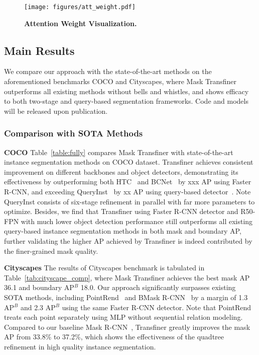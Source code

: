 \documentclass[10pt,twocolumn,letterpaper]{article}
\newcommand{\parsection}[1]{\vspace{1mm}\noindent\textbf{#1}}
\begin{document}
\begin{figure}[!t]
	\centering
\texttt{[image: figures/att\_weight.pdf]}
	\caption{\textbf{Attention Weight Visualization.}}
	\label{fig:att_vis}
	\vspace{-0.1in}
\end{figure}

\subsection{Main Results}

We compare our approach with the state-of-the-art methods on the aforementioned benchmarks COCO and Cityscapes, where Mask Transfiner outperforms all existing methods without bells and whistles, and shows efficacy to both two-stage and query-based segmentation frameworks. 
Code and models will be released upon publication.

\subsubsection{Comparison with SOTA Methods}

\parsection{COCO} Table~\ref{table:fully} compares Mask Transfiner with state-of-the-art instance segmentation methods on COCO dataset.
Transfiner achieves consistent improvement on different backbones and object detectors, demonstrating its effectiveness by outperforming both HTC~\cite{chen2019hybrid} and BCNet~\cite{ke2021bcnet} by xxx AP using Faster R-CNN, and exceeding QueryInst~\cite{QueryInst} by xx AP using query-based detector~\cite{carion2020end}. Note QueryInst consists of six-stage refinement in parallel with far more parameters to optimize.
Besides, we find that Transfiner using Faster R-CNN detector and R50-FPN with much lower object detection performance still outperforms all existing query-based instance segmentation methods in both mask and boundary AP, further validating the higher AP achieved by Transfiner is indeed contributed by the finer-grained mask quality.


\parsection{Cityscapes}
The results of Cityscapes benchmark is tabulated in Table~\ref{tab:cityscape_comp}, where Mask Transfiner achieves the best mask AP 36.1 and boundary AP$^{B}$ 18.0. Our approach significantly surpasses existing SOTA methods, including PointRend~\cite{kirillov2020pointrend}
and BMask R-CNN~\cite{ChengWHL20} by a margin of 1.3 AP$^{B}$ and 2.3 AP$^{B}$ using the same Faster R-CNN detector. Note that PointRend treats each point separately using MLP without sequential relation modeling. Compared to our baseline Mask R-CNN~\cite{he2017mask}, Transfiner greatly improves the mask AP from 33.8\% to 37.2\%, which shows the effectiveness of the quadtree refinement in high quality instance segmentation.
\end{document}
